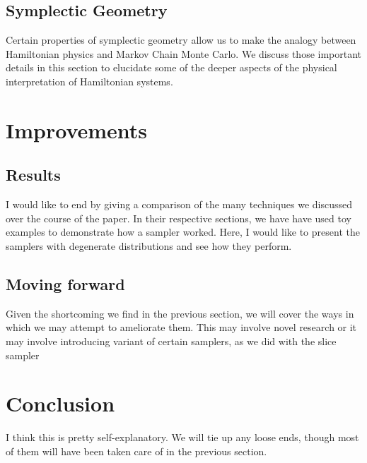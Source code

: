 \documentclass[11pt, a4paper]{article}
\theoremstyle{plain}
\theoremstyle{definition}
\begin{document}
\subsection{Symplectic Geometry}
Certain properties of symplectic geometry allow us to make the analogy between
Hamiltonian physics and Markov Chain Monte Carlo. We discuss those 
important details in this section to elucidate some of the deeper aspects
of the physical interpretation of Hamiltonian systems.
\section{Improvements}
\subsection{Results}
I would like to end by giving a comparison of the many techniques we discussed
over the course of the paper. In their respective sections, we have have used
toy examples to demonstrate how a sampler worked. Here, I would like to present
the samplers with degenerate distributions and see how they perform. 
\subsection{Moving forward}
Given the shortcoming we find in the previous section, we will cover the ways
in which we may attempt to ameliorate them. This may involve
novel research or it may involve introducing variant of certain samplers,
as we did with the slice sampler
\section{Conclusion}
I think this is pretty self-explanatory. We will tie up any loose ends, though 
most of them will have been taken care of in the previous section.

{}
\end{document}
